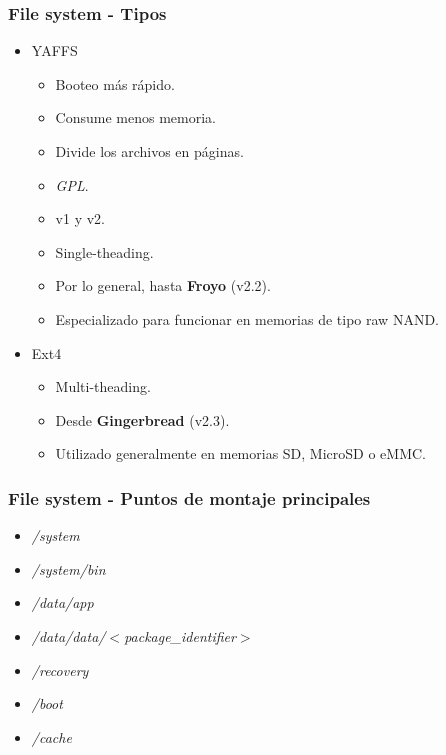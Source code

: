 \begin{frame}
  \frametitle{File system - Tipos}
  \begin{itemize}
      \item YAFFS
      \begin{itemize}
	\item Booteo más rápido.
	
	\item Consume menos memoria.
	
	\item Divide los archivos en páginas.
	
	\item \textit{GPL}.
	
	\item v1 y v2.
	
	\item Single-theading.
	
	\item Por lo general, hasta \textbf{Froyo} (v2.2).
	
	\item Especializado para funcionar en memorias de tipo raw NAND.
      \end{itemize}
      
      \item Ext4
      \begin{itemize}
	\item Multi-theading.
	
	\item Desde \textbf{Gingerbread} (v2.3).
	
	\item Utilizado generalmente en memorias SD, MicroSD o eMMC.
      \end{itemize}   
  \end{itemize}
\end{frame}

\begin{frame}[fragile]
  \frametitle{File system - Puntos de montaje principales}
  \begin{itemize}
      \item \textit{/system}
      
      \item \textit{/system/bin}
      
      \item \textit{/data/app}
      
      \item \textit{/data/data/$<$package\_identifier$>$}
      
      \item \textit{/recovery}
      
      \item \textit{/boot}
      
      \item \textit{/cache}
  \end{itemize}
\end{frame}

